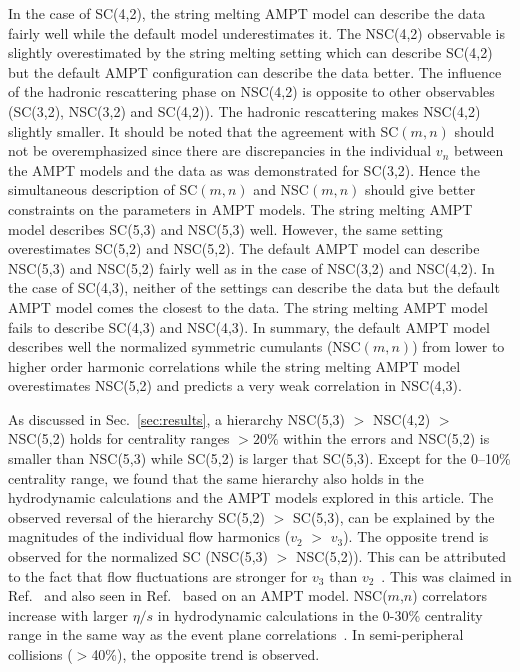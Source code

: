 In the case of SC(4,2), the string melting AMPT model can describe the data fairly well while the default model underestimates it.
The NSC(4,2) observable is slightly overestimated by the string melting setting which can describe SC(4,2) but the default AMPT configuration can describe the data better.
The influence of the hadronic rescattering phase on NSC(4,2) is opposite to other observables (SC(3,2), NSC(3,2) and SC(4,2)). The hadronic rescattering makes NSC(4,2) slightly smaller.
It should be noted that the agreement with SC$(m,n)$ should not be overemphasized since there are discrepancies in the individual $v_n$ between the AMPT models and the data as was demonstrated for SC(3,2).
Hence the simultaneous description of SC$(m,n)$ and NSC$(m,n)$ should give better constraints on the parameters in AMPT models.
The string melting AMPT model describes SC(5,3) and NSC(5,3) well. However, the same setting overestimates SC(5,2) and NSC(5,2). 
The default AMPT model can describe NSC(5,3) and NSC(5,2) fairly well as in the case of NSC(3,2) and NSC(4,2).
In the case of SC(4,3), neither of the settings can describe the data but the default AMPT model comes the closest to the data. 
The string melting AMPT model fails to describe SC(4,3) and NSC(4,3).
In summary, the default AMPT model describes well the normalized symmetric cumulants (NSC$(m,n)$) from lower to higher order harmonic correlations while the string melting AMPT model overestimates NSC(5,2) and predicts a very weak correlation in NSC(4,3). 


As discussed in Sec.~\ref{sec:results}, a hierarchy NSC(5,3) $>$ NSC(4,2) $>$ NSC(5,2) holds for centrality ranges $>20\%$ within the errors and NSC(5,2) is smaller than NSC(5,3) while SC(5,2) is larger that SC(5,3).
Except for the 0--10\% centrality range, we found that the same hierarchy also holds in the hydrodynamic calculations and the AMPT models explored in this article.
The observed reversal of the hierarchy SC(5,2) $>$ SC(5,3), can be explained by the magnitudes of the individual flow harmonics ($v_2$ $>$ $v_3$). 
The opposite trend is observed for the normalized SC (NSC(5,3) $>$ NSC(5,2)). This can be attributed to the fact that flow fluctuations are stronger for $v_3$ than $v_2$~\cite{Aad:2013xma}. This was claimed in Ref.~\cite{Zhu:2016puf} and also seen in Ref.~\cite{Bhalerao:2014xra} based on an AMPT model. 
NSC($m$,$n$) correlators increase with larger $\eta/s$ in hydrodynamic calculations in the 0-30\% centrality range in the same way as the event plane correlations~\cite{Bhalerao:2013ina,Teaney:2013dta}. In semi-peripheral collisions ($>$40\%), the opposite trend is observed.


